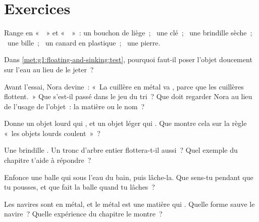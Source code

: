 \section{Exercices}

\begin{exercise}[$\star$]\label{exo:g1:floating-and-sinking:1}
Range en «~~» et «~~»~: un bouchon de liège~; \ une clé~;
\ une brindille sèche~; \ une bille~; \ un canard en plastique~; \ une
pierre.
\end{exercise}

\begin{exercise}[$\star$]\label{exo:g1:floating-and-sinking:2}
Dans \cref{met:g1:floating-and-sinking:test}, pourquoi faut-il poser
l'objet doucement sur l'eau au lieu de le jeter~?
\end{exercise}

\begin{exercise}[$\star$]\label{exo:g1:floating-and-sinking:3}
Avant l'essai, Nora devine~: «~La cuillère en métal va , parce
que les cuillères flottent.~» Que s'est-il passé dans le jeu du tri~?
Que doit regarder Nora au lieu de l'usage de l'objet~: la matière ou
le nom~?
\end{exercise}

\begin{exercise}[$\star$]\label{exo:g1:floating-and-sinking:4}
Donne un objet lourd qui , et un objet léger qui . Que
montre cela sur la règle «~les objets lourds coulent~»~?
\end{exercise}

\begin{exercise}[$\star$]\label{exo:g1:floating-and-sinking:5}
Une brindille . Un tronc d'arbre entier flottera-t-il aussi~?
Quel exemple du chapitre t'aide à répondre~?
\end{exercise}

\begin{exercise}[$\star$]\label{exo:g1:floating-and-sinking:6}
Enfonce une balle qui  sous l'eau du bain, puis lâche-la. Que
sens-tu pendant que tu pousses, et que fait la balle quand tu
lâches~?
\end{exercise}

\begin{exercise}[$\star$]\label{exo:g1:floating-and-sinking:7}
Les navires sont en métal, et le métal est une matière qui .
Quelle forme sauve le navire~? Quelle expérience du chapitre le
montre~?
\end{exercise}

